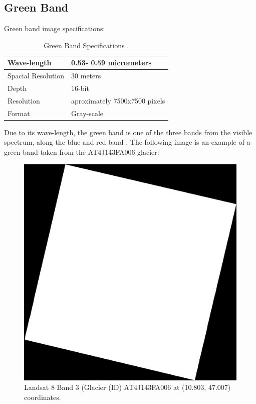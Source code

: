\documentclass[12pt, a4paper]{report}
\begin{document}
	\subsection{Green Band}
	Green band image specifications:
	\begin{table} [H]
		\center
		\begin{tabular} {|  l | L{10cm} |}
			\hline
			Wave-length & 0.53- 0.59 micrometers \\ [0.2ex]
			\hline
			Spacial Resolution & 30 meters \\ [0.2ex]
			\hline
			Depth & 16-bit \\ [0.2ex]
			\hline
			Resolution & aproximately 7500x7500 pixels \\ [0.2ex]
			\hline 
			Format & Gray-scale \\ [0.2ex]
			\hline
		\end{tabular}
		\caption{Green Band Specifications \cite{green_band, band_combination}.}
		\label{table:green_band_specifications}
	\end{table}
	Due to its wave-length, the green band is one of the three bands from the visible spectrum, along the blue and red band \cite{band_information}. The following image is an example of a green band taken from the AT4J143FA006 glacier:
	\begin{figure}[H]
		\centering
		\includegraphics[scale=1]{LC81930272018108LGN00_B3.png}
		\caption{Landsat 8 Band 3 (Glacier (ID) AT4J143FA006 at (10.803, 47.007) coordinates.
			\cite{green_band}}
		\label{fig:band3}
	\end{figure}
\end{document}
